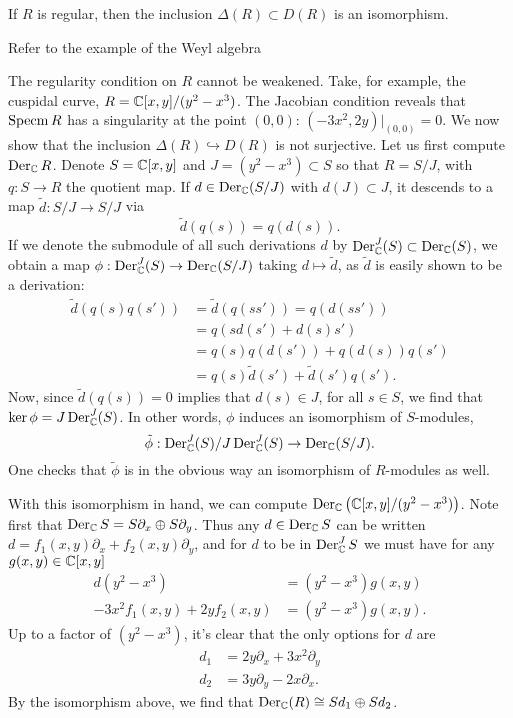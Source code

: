 \begin{theorem}
    If $R$ is regular, then the inclusion $\Delta(R)\subset D(R)$ is an isomorphism.
    \label{thm:derivationiso}
\end{theorem}

Refer to the example of the Weyl algebra %

\begin{example}
    The regularity condition on $R$ cannot be weakened. Take, for example, the cuspidal curve,
    $R=\mathbb{C}[x,y]/(y^2-x^3)$. The Jacobian condition reveals that $\operatorname{Specm} R$ has a
    singularity at the point $(0,0)$: $(-3x^2, 2y)|_{(0,0)}=0$. We now show that the inclusion
    $\Delta(R)\hookrightarrow D(R)$ is not surjective. Let us first compute $\operatorname{Der}_{\mathbb{C}} R$.
    Denote $S=\mathbb{C}[x,y]$ and $J=(y^2-x^3)\subset S$ so that $R=S/J$, with $q:S\to R$ the quotient map.
    If $d\in\operatorname{Der}_{\mathbb{C}}(S/J)$ with $d(J)\subset J$, it descends to a map $\tilde d:S/J\to S/J$ via
    \[\tilde d(q(s))=q(d(s)).\] If we denote the submodule of all such derivations $d$ by
    $\operatorname{Der}^J_{\mathbb{C}}(S)\subset\operatorname{Der}_{\mathbb{C}}(S)$, we obtain a map $\phi:\operatorname{Der}^J_{\mathbb{C}}(S)\to\operatorname{Der}_{\mathbb{C}}(S/J)$ taking
    $d\mapsto \tilde d$, as $\tilde d$ is easily shown to be a derivation:
    \begin{align*}
        \tilde d(q(s)q(s')) &= \tilde d\left( q(ss') \right)=q(d(ss'))\\
        &= q(sd(s')+d(s)s')\\
        &= q(s)q(d(s')) + q(d(s))q(s')\\
        &= q(s)\tilde d(s') + \tilde d(s')q(s').
    \end{align*}
    Now, since $\tilde d(q(s))=0$ implies that $d(s)\in J$, for all $s\in S$, we find that
    $\ker\phi = J\operatorname{Der}^J_{\mathbb{C}}(S)$. In other words, $\phi$ induces an isomorphism of $S$-modules,
    \[\tilde \phi:\operatorname{Der}^J_{\mathbb{C}}(S)/J\operatorname{Der}_{\mathbb{C}}^J(S)\to\operatorname{Der}_{\mathbb{C}}(S/J).\]
    One checks that $\tilde\phi$ is in the obvious way an isomorphism of $R$-modules as well.

    With this isomorphism in hand, we can compute $\operatorname{Der}_{\mathbb{C}}\left( \mathbb{C}[x,y]/(y^2-x^3) \right)$.
    Note first that $\operatorname{Der}_{\mathbb{C}} S=S\partial_x\oplus S\partial_y$. Thus any $d\in\operatorname{Der}_{\mathbb{C}} S$ can
    be written $d=f_1(x,y)\partial_x+f_2(x,y)\partial_y$, and for $d$ to be in $\operatorname{Der}_{\mathbb{C}}^JS$
    we must have for any $g(x,y)\in\mathbb{C}[x,y]$
    \begin{align*}
        d(y^2-x^3) &= (y^2-x^3)g(x,y)\\
        -3x^2f_1(x,y)+2yf_2(x,y) &= (y^2-x^3)g(x,y).
    \end{align*}
    Up to a factor of $(y^2-x^3)$, it's clear that the only options for $d$ are
    \begin{align*}
        d_1 &= 2y\partial_x + 3x^2\partial_y\\
        d_2 &= 3y\partial_y-2x\partial_x.
    \end{align*}
    By the isomorphism above, we find that $\operatorname{Der}_{\mathbb{C}}(R)\cong Sd_1\oplus Sd_2$.


\end{example}
